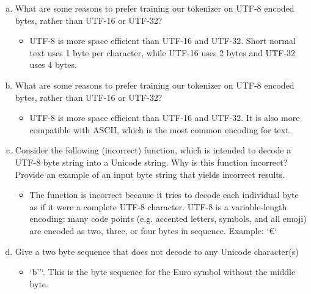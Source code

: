 \documentclass{article}
\begin{document}
\begin{enumerate}[a)]
  \item What are some reasons to prefer training our tokenizer on UTF-8 encoded bytes, rather than
  UTF-16 or UTF-32?
  \begin{itemize}
    \item UTF-8 is more space efficient than UTF-16 and UTF-32. Short normal text uses 1 byte per character, while UTF-16 uses 2 bytes and UTF-32 uses 4 bytes.
  \end{itemize}

  \item What are some reasons to prefer training our tokenizer on UTF-8 encoded bytes, rather than
  UTF-16 or UTF-32?
  \begin{itemize}
    \item UTF-8 is more space efficient than UTF-16 and UTF-32. It is also more compatible with ASCII, which is the most common encoding for text.
  \end{itemize}

  \item Consider the following (incorrect) function, which is intended to decode a UTF-8 byte string into
  a Unicode string. Why is this function incorrect? Provide an example of an input byte string
  that yields incorrect results.
  \begin{itemize}
    \item The function is incorrect because it tries to decode each individual byte as if it were a complete UTF-8 character. UTF-8 is a variable-length encoding: many code points (e.g. accented letters, symbols, and all emoji) are encoded as two, three, or four bytes in sequence. Example: `€`
  \end{itemize}

  \item Give a two byte sequence that does not decode to any Unicode character(s)
  \begin{itemize}
    \item `b'\xac'`. This is the byte sequence for the Euro symbol without the middle byte.
  \end{itemize}
\end{enumerate}
\end{document}
